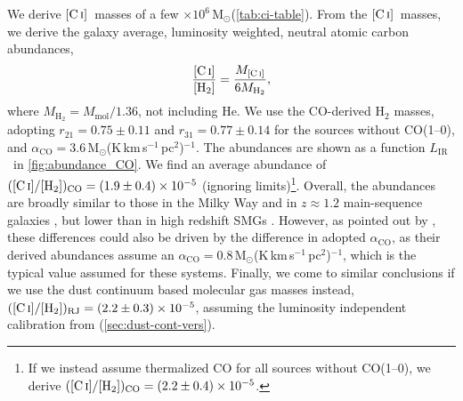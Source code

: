 \documentclass[twocolumn]{aastex62}
\newcommand{\solarmass}{\ensuremath{\mathrm{M}_{\odot}}}
\newcommand{\Msun}{\solarmass}
\newcommand{\LIR}{\ensuremath{L_{\mathrm{IR}}}}
\newcommand{\Mmol}{\ensuremath{M_{\mathrm{mol}}}}
\newcommand{\MH}{\ensuremath{M_{\mathrm{H}_{2}}}}
\newcommand{\MCI}{\ensuremath{M_{\mathrm{\CI}}}}
\newcommand{\HH}{\ensuremath{\mathrm{H}_{2}}}
\newcommand{\CIHH}{\ensuremath{\CI/[\HH]}}
\newcommand{\aco}{\ensuremath{\alpha_{\mathrm{CO}}}}
\newcommand{\CI}{\ensuremath{\mathrm{[C\, \textsc{i}]}}}
\newcommand{\avgCIabundCO}{\ensuremath{(1.9 \pm 0.4) \times 10^{-5}}}
\newcommand{\avgCIabundCOtherm}{\ensuremath{(2.2 \pm 0.4) \times 10^{-5}}}
\newcommand{\avgCIabundDust}{\ensuremath{(2.2 \pm 0.3) \times 10^{-5}}}
\newcommand{\rTwoOneLVGzLoTwo}{\ensuremath{0.75 \pm 0.11}}
\newcommand{\rThreeOnestack}{\ensuremath{0.77 \pm 0.14}}
\begin{document}
We derive \CI\ masses of a few $\times 10^{6}$\,\Msun (\autoref{tab:ci-table}).
From the \CI\ masses, we derive the galaxy average, luminosity weighted,
neutral atomic carbon abundances,
\begin{align}
  \frac{\CI}{[\mathrm{H}_{2}]} = \frac{\MCI}{6\MH}, \label{eq:ci-abund}
\end{align}
where $\MH = \Mmol / 1.36$, not including He.  We use the CO-derived H$_{2}$
masses, adopting $r_{21}=\rTwoOneLVGzLoTwo$ and $r_{31}=\rThreeOnestack$ for
the sources without CO(1--0), and
$\aco=3.6$\,\Msun(K\,km\,s$^{-1}$\,pc$^{2}$)$^{-1}$.  The abundances are shown
as a function \LIR\ in \autoref{fig:abundance_CO}.  We find an average
abundance of $(\CIHH)_{\rm CO} = \avgCIabundCO$ (ignoring limits)\footnote{If
  we instead assume thermalized CO for all sources without CO(1--0), we derive
  $(\CIHH)_{\rm CO} = \avgCIabundCOtherm$.}.  Overall, the abundances are
broadly similar to those in the Milky Way
\citep[$2.2\times10^{-5}$,][]{Frerking1989} and in $z \approx 1.2$
main-sequence galaxies
\citep[$(1.6 \pm 0.8) \times 10^{-5}$,][]{Valentino2018}, but lower than in
high redshift SMGs \citep{Walter2011, Alaghband-Zadeh2013, Bothwell2017}.
However, as pointed out by \cite{Valentino2018}, these differences could also
be driven by the difference in adopted \aco, as their derived abundances assume
an $\aco=0.8$\,\Msun(K\,km\,s$^{-1}$\,pc$^{2}$)$^{-1}$, which is the typical
value assumed for these systems.  Finally, we come to similar conclusions if we
use the dust continuum based molecular gas masses instead,
$(\CIHH)_{\rm RJ} = \avgCIabundDust$, assuming the luminosity independent
calibration from \cite{Scoville2016} (\autoref{sec:dust-cont-vers}).
\end{document}
